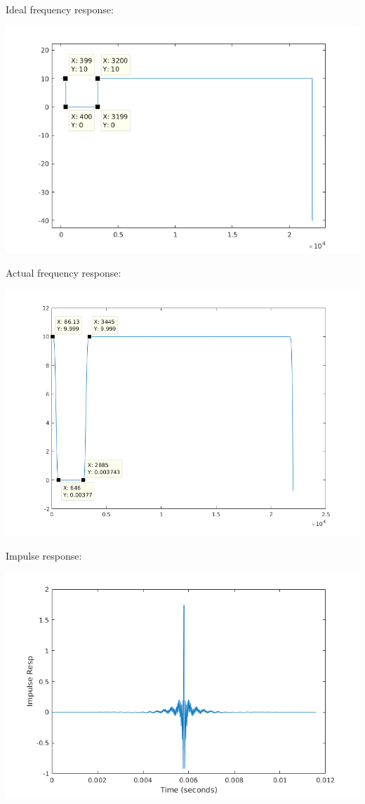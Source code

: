 \documentclass[titlepage]{article}
\begin{document}
Ideal frequency response:

\begin{center}
\includegraphics[width=.9\linewidth]{ideal_fr_a.png}
\end{center}

Actual frequency response:

\begin{center}
\includegraphics[width=.9\linewidth]{fr_a.png}
\end{center}

Impulse response:

\begin{center}
\includegraphics[width=.9\linewidth]{ir_a.png}
\end{center}
\end{document}
